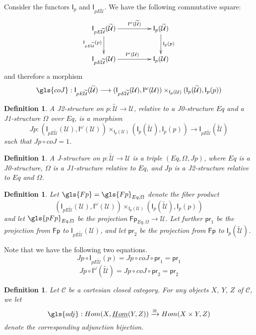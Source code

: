 \documentclass[12pt]{article}
\numberwithin{equation}{section}
\newenvironment{eq}{\begin{equation}}{\end{equation}}
\newtheorem{definition}[proposition]{Definition}
\newcommand{\sr}{\rightarrow}
\newcommand{\lr}{\longrightarrow}
\newcommand{\uu}{\underline}
\newcommand{\iHom}{\uu{Hom}}
\newcommand{\wt}{\widetilde}
\newcommand{\C}{{\mathcal C}}  %
\newcommand{\id}{1}            %
\newcommand{\U}{\mathcal{U}}
\newcommand{\I}{\mathsf{I}}
\newcommand{\Fp}{\mathsf{Fp}}
\newcommand{\pr}{\mathsf{pr}}
\begin{document}
Consider the functors $\I_{p}$ and $\I_{pE\wt{\U}}$. We have the following
commutative square:
%
\begin{eq}\label{2010.sq1}
\begin{xy}
          \xymatrix@C=4pc{ \I_{pE\wt{\U}}(\wt{\U}) \ar[r]^-{\I^{\omega}(\wt{\U})}
            \ar[d]_{\I_{pE\wt{\U}}(p)} & \I_p(\wt{\U})
            \ar[d]^{\I_p(p)}\\ \I_{pE\wt{\U}}(\U) \ar[r]^{\I^{\omega}(\U)} & \I_p(\U) }
\end{xy}
\end{eq}%
%
and therefore a morphism
%
$$\gls{coJ} : \I_{pE\wt{\U}}(\wt{\U}) \lr (\I_{pE\wt{\U}}(\U), \I^{\omega}(\U))
\times_{\I_p(\U)} (\I_p(\wt{\U}), \I_p(p))
$$
%
\begin{definition}
\label{2015.03.27.def6} A {\em J2-structure} on $p:\wt{\U}\sr \U$, relative to a J0-structure $Eq$
and a J1-structure $\Omega$ over $Eq$, is a morphism
%
$$ Jp:( \I_{pE\wt{\U}}(\U), \I^{\omega}(\U))\times_{\I_p(\U)} (\I_p(\wt{\U}), \I_p(p))\sr
\I_{pE\wt{\U}}(\wt{\U}) $$
%
such that $Jp\circ coJ = \id$.
\end{definition}

\begin{definition}
  A J-structure on $p:\wt{\U}\sr \U$ is a triple $(Eq,\Omega,Jp)$, where $Eq$
  is a J0-structure, $\Omega$ is a J1-structure relative to $Eq$, and $Jp$ is a
  J2-structure relative to $Eq$ and $\Omega$.
\end{definition}

\begin{definition}
  \label{Fp-defn}
Let $\gls{Fp} = \gls{Fp}_{Eq,\Omega}$ denote the fiber product
%
$$(\I_{pE\wt{\U}}(\U), \I^{\omega}(\U)) \times_{\I_p(\U)} (\I_p(\wt{\U}), \I_p(p))$$
%
and let $\gls{pFp}_{Eq,\Omega}$ be the projection
$\Fp_{Eq,\Omega}\sr \U$. Let further $\pr_1$ be the projection from $\Fp$ to
$\I_{pE\wt{\U}}(\U)$, and let $\pr_2$ be the projection from $\Fp$ to $\I_p(\wt{\U})$.
\end{definition}

Note that we have the following two equations.
\begin{eq}
  \label{2015.04.04.eq2}
  Jp \circ \I_{pE\wt{\U}}(p)=Jp \circ coJ\circ \pr_1 = \pr_1
\end{eq}
\begin{eq}
  \label{2015.04.04.eq1}
  Jp \circ \I^{\omega}(\wt{\U}) = Jp \circ coJ\circ \pr_2 = \pr_2 
\end{eq}

\begin{definition}
  Let $\C$ be a cartesian closed category.  For any objects $X$, $Y$, $Z$ of $\C$, we let
  $$ \gls{adj} : Hom (X, \iHom(Y,Z) ) \xrightarrow \cong Hom(X \times Y, Z) $$
  denote the corresponding adjunction bijection.
\end{definition}
\end{document}

